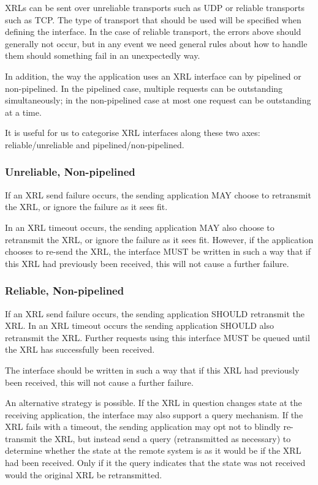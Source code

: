 \documentclass[11pt]{article}
\begin{document}
XRLs can be sent over unreliable transports such as UDP or reliable
transports such as TCP. The type of transport that should be used will
be specified when defining the interface. In the case of reliable
transport, the errors above should generally not occur, but in any
event we need general rules about how to handle them should something
fail in an unexpectedly way.

In addition, the way the application uses an XRL interface can by
pipelined or non-pipelined.  In the pipelined case, multiple requests
can be outstanding simultaneously; in the non-pipelined case at most
one request can be outstanding at a time.

It is useful for us to categorise XRL interfaces along these two axes:
reliable/unreliable and pipelined/non-pipelined.

\subsubsection*{Unreliable, Non-pipelined}

If an XRL send failure occurs, the sending application MAY choose to
retransmit the XRL, or ignore the failure as it sees fit.  

In an XRL timeout occurs, the sending application MAY also choose to
retransmit the XRL, or ignore the failure as it sees fit.  However, if
the application chooses to re-send the XRL, the interface MUST be
written in such a way that if this XRL had previously been received,
this will not cause a further failure.

\subsubsection*{Reliable, Non-pipelined}

If an XRL send failure occurs, the sending application SHOULD
retransmit the XRL.  In an XRL timeout occurs the sending application
SHOULD also retransmit the XRL.  Further requests using this interface
MUST be queued until the XRL has successfully been received.

The interface should be written in such a way that if this XRL had
previously been received, this will not cause a further failure.

An alternative strategy is possible.  If the XRL in question changes
state at the receiving application, the interface may also support a
query mechanism.  If the XRL fails with a timeout, the sending
application may opt not to blindly re-transmit the XRL, but instead
send a query (retransmitted as necessary) to determine whether the
state at the remote system is as it would be if the XRL had been
received.  Only if it the query indicates that the state was not
received would the original XRL be retransmitted.
\end{document}

